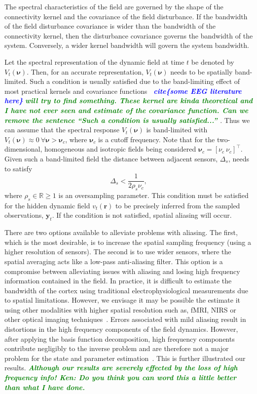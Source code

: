 \documentclass[12pt]{iopart}
\newcommand{\todo}[1]{\textsf{\emph{\textbf{\textcolor{blue}{#1}}}}}
\newcommand{\omg}[1]{\textsf{\emph{\textbf{\textcolor{green}{#1}}}}}
\begin{document}
The spectral characteristics of the field are governed by the shape of the connectivity kernel and the covariance of the field disturbance. If the bandwidth of the field disturbance covariance is wider than the bandwidth of the connectivity kernel, then the disturbance covariance governs the bandwidth of the system. Conversely, a wider kernel bandwidth will govern the system bandwidth.

Let the spectral representation of the dynamic field at time $t$ be denoted by $V_t(\boldsymbol{\nu})$. Then, for an accurate representation, $V_t(\boldsymbol{\nu})$ needs to be spatially band-limited. Such a condition is usually satisfied due to the band-limiting effect of most practical kernels and covariance functions \todo{~cite\{some EEG literature here\}} \omg{will try to find something. These kernel are kinda theoretical and I have not ever seen and estimate of the covariance function. Can we remove the sentence ``Such a condition is usually satisfied...'' }. Thus we can assume that the spectral response $V_t(\boldsymbol{\nu})$ is band-limited with $V_t(\boldsymbol{\nu}) \approx 0 ~ \forall \boldsymbol{\nu} > \boldsymbol{\nu}_c$, where $\boldsymbol{\nu}_c$ is a cutoff frequency. Note that for the two-dimensional, homogeneous and isotropic fields being considered $\boldsymbol{\nu}_c = [\nu_c ~ \nu_c]^\top$. Given such a band-limited field the distance between adjacent sensors, $\Delta_s$, needs to satisfy 
\begin{equation}
	\label{eq:MinimumSensorDistance} \Delta_s < \frac{1}{2\rho_s\nu_{c}}, 
\end{equation}
where $\rho_s \in \mathbb{R} \ge 1$ is an oversampling parameter. This condition must be satisfied for the hidden dynamic field $v_t(\mathbf{r})$ to be precisely inferred from the sampled observations, $\mathbf{y}_t$. If the condition is not satisfied, spatial aliasing will occur. 

There are two options available to alleviate problems with aliasing. The first, which is the most desirable, is to increase the spatial sampling frequency (using a higher resolution of sensors). The second is to use wider sensors, where the spatial averaging acts like a low-pass anti-aliasing filter. This option is a compromise between alleviating issues with aliasing and losing high frequency information contained in the field. In practice, it is difficult  to estimate the bandwidth of the cortex using traditional electrophysiological measurements due to spatial limitations. However, we envisage it may be possible the estimate it using other modalities with higher spatial resolution such as, fMRI, NIRS or other optical imaging techniques~\cite{Issa2000}. Errors associated with mild aliasing result in distortions in the high frequency components of the field dynamics. However, after applying the basis function decomposition, high frequency components contribute negligibly to the inverse problem and are therefore not a major problem for the state and parameter estimation~\cite{Sanner1992}. This is further illustrated our results. \omg{Although our results are severely effected by the loss of high frequency info! Ken: Do you think you can word this a little better than what I have done.}
\end{document}

